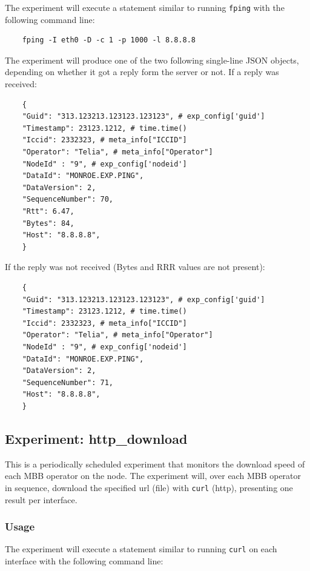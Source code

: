 \documentclass[a4paper,10pt]{article}
\newcommand{\VerbatimFont}{\footnotesize}
\newcommand{\identifier}[1]{{\texttt{\small{#1}}}}
\begin{document}
The experiment will execute a statement similar to running \identifier{fping} with the following command line:

{\VerbatimFont
	\begin{verbatim}
	fping -I eth0 -D -c 1 -p 1000 -l 8.8.8.8
	\end{verbatim}}

The experiment will produce one of the two following single-line JSON objects, depending on whether it got a reply form the server or not.
If a reply was received:

{\VerbatimFont
	\begin{verbatim}
	{
	"Guid": "313.123213.123123.123123", # exp_config['guid']
	"Timestamp": 23123.1212, # time.time()
	"Iccid": 2332323, # meta_info["ICCID"]
	"Operator": "Telia", # meta_info["Operator"]
	"NodeId" : "9", # exp_config['nodeid']
	"DataId": "MONROE.EXP.PING",
	"DataVersion": 2,
	"SequenceNumber": 70,
	"Rtt": 6.47,
	"Bytes": 84,
	"Host": "8.8.8.8",
	}
	\end{verbatim}}

If the reply was not received (Bytes and RRR values are not present):

{\VerbatimFont
	\begin{verbatim}
	{
	"Guid": "313.123213.123123.123123", # exp_config['guid']
	"Timestamp": 23123.1212, # time.time()
	"Iccid": 2332323, # meta_info["ICCID"]
	"Operator": "Telia", # meta_info["Operator"]
	"NodeId" : "9", # exp_config['nodeid']
	"DataId": "MONROE.EXP.PING",
	"DataVersion": 2,
	"SequenceNumber": 71,
	"Host": "8.8.8.8",
	}
	\end{verbatim}}


\subsection{Experiment: http\_download}

This is a periodically scheduled experiment that monitors the download speed of each MBB operator on the node.
The experiment will, over each MBB operator in sequence, download the specified url (file) with \identifier{curl} (http), presenting one result per interface. 

\subsubsection{Usage}
The experiment will execute a statement similar to running \identifier{curl} on each interface with the following command line:
\end{document}
